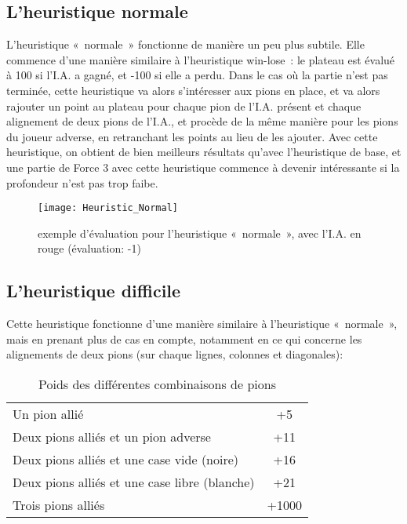 \subsection{L'heuristique normale}

L'heuristique « normale » fonctionne de manière un peu plus subtile. Elle commence d'une manière similaire
à l'heuristique win-lose : le plateau est évalué à 100 si l'I.A. a gagné, et -100 si elle a perdu.
Dans le cas où la partie n'est pas terminée, cette heuristique va alors s'intéresser aux pions en place,
et va alors rajouter un point au plateau pour chaque pion de l'I.A. présent et chaque alignement de deux
pions de l'I.A., et procède de la même manière pour les pions du joueur adverse, en retranchant les points
au lieu de les ajouter. Avec cette heuristique, on obtient de bien meilleurs résultats qu'avec l'heuristique
de base, et une partie de Force 3 avec cette heuristique commence à devenir intéressante si la
profondeur n'est pas trop faibe.

\begin{figure}[H]
    \centering
    \texttt{[image: Heuristic\_Normal]}{}
    \caption{exemple d'évaluation pour l'heuristique « normale », avec l'I.A. en rouge (évaluation: -1)}
\end{figure}

\subsection{L'heuristique difficile}

Cette heuristique fonctionne d'une manière similaire à l'heuristique « normale », mais en prenant plus de
cas en compte, notamment en ce qui concerne les alignements de deux pions (sur chaque lignes, colonnes et diagonales):

\begin{table}[H]
    \begin{tabular}{lc}
        Un pion allié                                 & +5    \\
        Deux pions alliés et un pion adverse          & +11   \\
        Deux pions alliés et une case vide (noire)    & +16   \\
        Deux pions alliés et une case libre (blanche) & +21   \\
        Trois pions alliés                            & +1000 \\
    \end{tabular}
    \caption{Poids des différentes combinaisons de pions}
\end{table}

